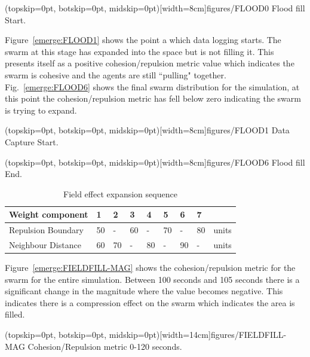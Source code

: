 \documentclass{ieeeaccess}
\begin{document}
\Figure[t!](topskip=0pt, botskip=0pt, midskip=0pt)[width=8cm]{figures/FLOOD0}
{Flood fill Start.\label{emerge:FLOOD0}}

Figure~\ref{emerge:FLOOD1} shows the point a which data logging starts. The swarm at this stage has expanded into the space but is not filling it. This presents itself as a positive cohesion/repulsion metric value which indicates the swarm is cohesive and the agents are still ``pulling" together. Fig.~\ref{emerge:FLOOD6} shows the final swarm distribution for the simulation, at this point the cohesion/repulsion metric has fell below zero indicating the swarm is trying to expand. 

\Figure[t!](topskip=0pt, botskip=0pt, midskip=0pt)[width=8cm]{figures/FLOOD1}
{Data Capture Start.\label{emerge:FLOOD1}}

\Figure[t!](topskip=0pt, botskip=0pt, midskip=0pt)[width=8cm]{figures/FLOOD6}
{Flood fill End.\label{emerge:FLOOD6}}

\begin{table}[H]
\begin{center}
\begin{tabular}{| p{1.8cm} | p{0.3cm} | p{0.3cm} | p{0.3cm} | p{0.3cm} | p{0.3cm} | p{0.3cm} | p{0.3cm} | p{0.7cm} |}
\hline
\bf Weight \bf component & \bf 1 & \bf 2 & \bf 3 & \bf 4 & \bf 5 & \bf 6 & \bf 7 & \\ \hline
Repulsion Boundary & 50 & -  & 60 & -  & 70 & -  & 80 & units\\  \hline
Neighbour Distance & 60 & 70 & -  & 80 & -  & 90 & -  & units\\  \hline
\end{tabular}\caption{Field effect expansion sequence} \label{tab:FillSequence}
\end{center}
\end{table}

Figure~\ref{emerge:FIELDFILL-MAG} shows the cohesion/repulsion metric for the swarm for the entire simulation. Between 100 seconds and 105 seconds there is a significant change in the magnitude where the value becomes negative. This indicates there is a compression effect on the swarm which indicates the area is filled.

\Figure[t!](topskip=0pt, botskip=0pt, midskip=0pt)[width=14cm]{figures/FIELDFILL-MAG}
{Cohesion/Repulsion metric 0-120 seconds.\label{emerge:FIELDFILL-MAG}}

\end{document}
